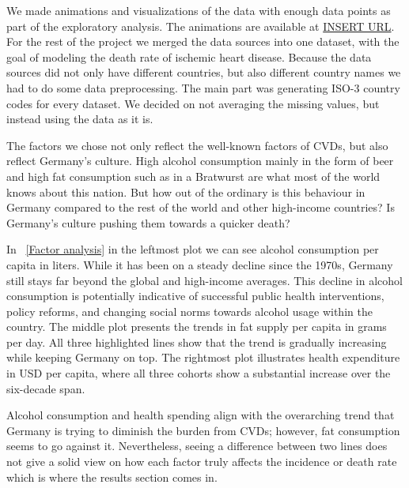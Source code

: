 We made animations and visualizations of the data with enough data points as part of the exploratory analysis. The animations are available at \url{INSERT URL}. 
For the rest of the project we merged the data sources into one dataset, with the goal of modeling the death rate of ischemic heart disease. Because the data sources did not 
only have different countries, but also different country names we had to do some data preprocessing. The main part was generating ISO-3 country codes for every dataset. 
We decided on not averaging the missing values, but instead using the data as it is.


The factors we chose not only reflect the well-known factors of CVDs, but also reflect Germany's culture. High alcohol consumption mainly in the form of beer and high fat consumption such as in a Bratwurst are what most of the world knows about this nation. But how out of the ordinary is this behaviour in Germany compared to the rest of the world and other high-income countries? Is Germany's culture pushing them towards a quicker death?


In \figurename~\ref{Factor analysis} in the leftmost plot we can see alcohol consumption per capita in liters. While it has been on a steady decline since the 1970s, Germany still stays far beyond the global and high-income averages. This decline in alcohol consumption is potentially indicative of successful public health interventions, policy reforms, and changing social norms towards alcohol usage within the country. The middle plot presents the trends in fat supply per capita in grams per day. All three highlighted lines show that the trend is gradually increasing while keeping Germany on top. The rightmost plot illustrates health expenditure in USD per capita, where all three cohorts show a substantial increase over the six-decade span.

Alcohol consumption and health spending align with the overarching trend that Germany is trying to diminish the burden from CVDs; however, fat consumption seems to go against it. Nevertheless, seeing a difference between two lines does not give a solid view on how each factor truly affects the incidence or death rate which is where the results section comes in.